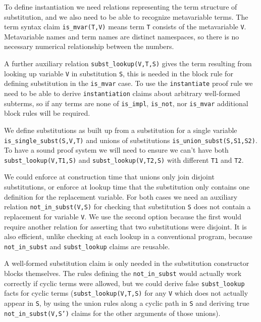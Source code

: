 \documentclass{article}
\theoremstyle{plain}
\theoremstyle{definition}
\begin{document}
To define instantiation we need relations representing the term structure of
substitution, and we also need to be able to recognize metavariable terms.
The term syntax claim \texttt{is\_mvar(T,V)} means term \texttt{T}
consists of the metavariable \texttt{V}.
Metavariable names and term names are distinct namespaces, so there is
no necessary numerical relationship between the numbers.

A further auxiliary relation \texttt{subst\_lookup(V,T,S)}
gives the term resulting from looking up variable \texttt{V} in
substitution \texttt{S}, this is needed in the block rule for
defining substitution in the \texttt{is\_mvar} case.
To use the \texttt{instantiate} proof rule we need to be able to
derive \texttt{instantiation} claims about arbitrary well-formed
subterms, so if any terms are none of \texttt{is\_impl}, \texttt{is\_not},
nor \texttt{is\_mvar} additional block rules will be required.

We define substitutions as built up from a substitution for a single
variable \texttt{is\_single\_subst(S,V,T)} and unions of substitutions
\texttt{is\_union\_subst(S,S1,S2)}.
To have a sound proof system we will need to ensure we can't have both
\texttt{subst\_lookup(V,T1,S)} and \texttt{subst\_lookup(V,T2,S)} with
different \texttt{T1} and \texttt{T2}.

We could enforce at construction time that unions only join disjoint
substitutions, or enforce at lookup time that the substitution only
contains one definition for the replacement variable.
For both cases we need an auxiliary relation \texttt{not\_in\_subst(V,S)}
for checking that substitution \texttt{S} does not contain a replacement
for variable \texttt{V}.
We use the second option because the first would require another relation
for asserting that two substitutions were disjoint.
It is also efficient, unlike checking at each lookup in a conventional
program, because \texttt{not\_in\_subst} and \texttt{subst\_lookup} claims
are reusable.

A well-formed substitution claim is only needed in the substitution
constructor blocks themselves.
The rules defining the \texttt{not\_in\_subst} would actually work
correctly if cyclic terms were allowed, but we could derive false
\texttt{subst\_lookup} facts for cyclic terms
(\texttt{subst\_lookup(V,T,S)} for any \texttt{V} which does not actually
appear in \texttt{S}, by using the union rules along a cyclic path in
\texttt{S} and deriving true \texttt{not\_in\_subst(V,S')} claims for the
other arguments of those unions).
\end{document}
